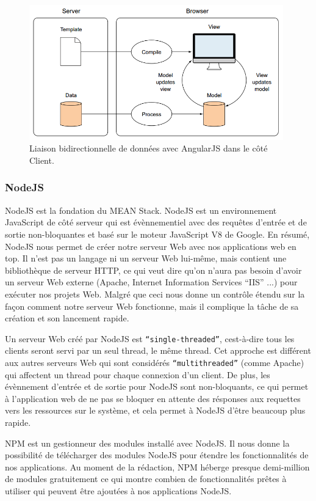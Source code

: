 \begin{figure}[H]
    \centering
    \includegraphics[width=11cm]{images/two-way-data-binding.png}
    \caption{Liaison bidirectionnelle de données avec AngularJS dans le côté Client.}
    \label{fig:two-way-data-binding}
\end{figure}

\subsubsection{NodeJS}

NodeJS est la fondation du MEAN Stack. NodeJS est un environnement JavaScript de côté serveur qui est évènnementiel avec des requêtes d'entrée et de sortie non-bloquantes et basé sur le moteur JavaScript V8 de Google. En résumé, NodeJS nous permet de créer notre serveur Web avec nos applications web en top. Il n'est pas un langage ni un serveur Web lui-même, mais contient une bibliothèque de serveur HTTP, ce qui veut dire qu'on n'aura pas besoin d'avoir un serveur Web externe (Apache, Internet Information Services ``IIS'' ...) pour exécuter nos projets Web. Malgré que ceci nous donne un contrôle étendu sur la façon comment notre serveur Web fonctionne, mais il complique la tâche de sa création et son lancement rapide.
\newline

Un serveur Web créé par NodeJS est \texttt{``single-threaded''}, cest-à-dire tous les clients seront servi par un seul thread, le même thread. Cet approche est différent aux autres serveurs Web qui sont considérés \texttt{``multithreaded''} (comme Apache) qui affectent un thread pour chaque connexion d'un client. De plus, les évènnement d'entrée et de sortie pour NodeJS sont non-bloquants\cite{blockingVSnonBlocking}, ce qui permet à l'application web de ne pas se bloquer en attente des résponses aux requettes vers les ressources sur le système, et cela permet à NodeJS d'être beaucoup plus rapide\cite{nodeJSvsPHP}.
\newline

NPM est un gestionneur des modules installé avec NodeJS. Il nous donne la possibilité de télécharger des modules NodeJS pour étendre les fonctionnalités de nos applications. Au moment de la rédaction, NPM héberge presque demi-million de modules gratuitement ce qui montre combien de fonctionnalités prêtes à utiliser qui peuvent être ajoutées à nos applications NodeJS.
